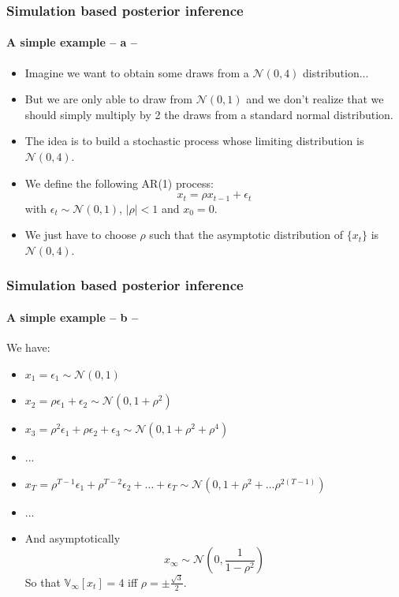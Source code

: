 \documentclass[10pt,slidestop]{beamer}
\begin{document}
\begin{frame}
  \frametitle{Simulation based posterior inference}
  \framesubtitle{A simple example -- a --}

    \begin{itemize}
        \item Imagine we want to obtain some draws from a $\mathcal N (0,4)$
        distribution...

        \bigskip

        \item But we are only able to draw from $\mathcal N (0,1)$
        and we don't realize that we should simply multiply by 2 the
        draws from a standard normal distribution.

        \bigskip

        \item The idea is to build a stochastic process whose limiting
        distribution is $\mathcal N (0,4)$.

        \bigskip

        \item We define the following AR(1) process:
        \[
            x_t = \rho x_{t-1} + \epsilon_t
        \]
        with $\epsilon_t \sim \mathcal N (0,1)$, $|\rho|<1$ and $x_0 =
        0$.

        \bigskip

        \item We just have to choose $\rho$ such that the asymptotic
        distribution of $\{x_t\}$ is $\mathcal N (0,4)$.
    \end{itemize}
\end{frame}


\begin{frame}
  \frametitle{Simulation based posterior inference}
  \framesubtitle{A simple example -- b --}
    We have:
    \begin{itemize}
        \item $x_1 = \epsilon_1 \sim \mathcal N(0,1)$
        \item $x_2 = \rho \epsilon_1 + \epsilon_2  \sim \mathcal N\left(0,1+\rho^2\right)$
        \item $x_3 = \rho^2 \epsilon_1 + \rho\epsilon_2+\epsilon_3  \sim \mathcal
N\left(0,1+\rho^2+\rho^4\right)$
        \item ... 
        \item $x_T = \rho^{T-1} \epsilon_1 +
          \rho^{T-2}\epsilon_2+\dots+\epsilon_{T} \sim \mathcal
          N\left(0,1+\rho^2+\dots\rho^{2(T-1)}\right)$
        \item ...
        \item And asymptotically
        \[
            x_{\infty}\sim \mathcal N\left(0,\frac{1}{1-\rho^2}\right)
        \]
        So that $\mathbb V_{\infty}[x_t] = 4$ iff $\rho = \pm
        \frac{\sqrt{3}}{2}$.
    \end{itemize}
\end{frame}
\end{document}

